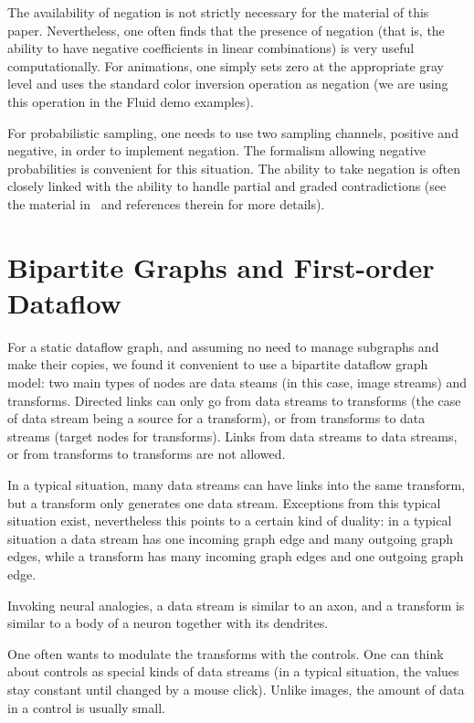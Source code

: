 \documentclass{llncs}
\begin{document}
The availability of negation is not strictly necessary for the material of this paper. Nevertheless, one often finds that the presence of negation
(that is, the ability to have negative coefficients in linear combinations) is very useful computationally.
For animations, one simply sets zero at the appropriate gray level and uses the standard color inversion operation as
negation (we are using this operation in the Fluid demo examples). 

For probabilistic sampling, one needs to use two sampling channels, positive and negative, in order to implement negation.
The formalism allowing negative probabilities is convenient for this situation. The ability to take negation is often
closely linked with the ability to handle partial and graded contradictions (see the material in~\cite{MBukatinMatthews} and
references therein for more details).

\section{Bipartite Graphs and First-order Dataflow}\label{first}

For a static dataflow graph, and assuming no need to manage subgraphs and make their copies, we found it
convenient to use a bipartite dataflow graph model: two main types of nodes are data steams (in this case,
image streams) and transforms. Directed links can only go from data streams to transforms (the case of data stream being a source for a transform),
or from transforms to data streams (target nodes for transforms). Links from data streams to data streams,
or from transforms to transforms are not allowed. 

In a typical situation, many data streams can have links into the same transform, but a transform only generates
one data stream. Exceptions from this typical situation exist, nevertheless this points to a certain kind of
duality: in a typical situation a data stream has one incoming graph edge and many outgoing graph edges,
while a transform has many incoming graph edges and one outgoing graph edge.

Invoking neural analogies, a data stream is similar to an axon, and a transform is similar to a body of a neuron together with its dendrites.

One often wants to modulate the transforms with the controls. One can think about controls
as special kinds of data streams (in a typical situation, the values stay constant until changed by a mouse
click). Unlike images, the amount of data in a control is usually small.
\end{document}
